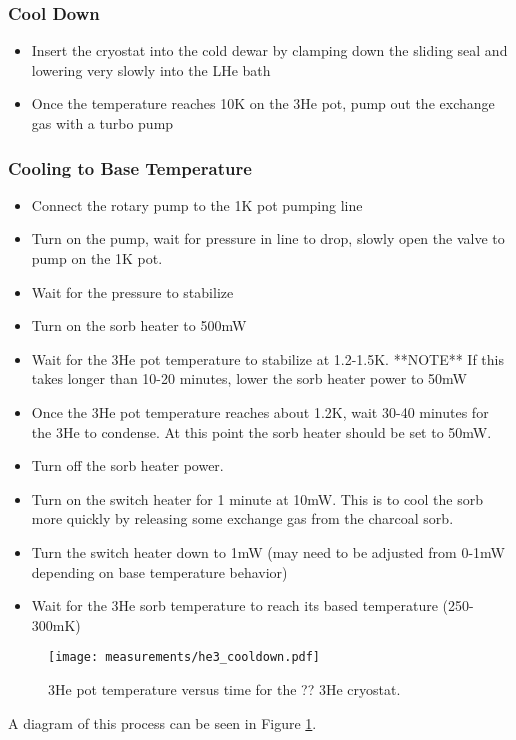\subsubsection*{Cool Down}

\begin{itemize}
\item Insert the cryostat into the cold dewar by clamping down the sliding seal and lowering very slowly into the LHe bath
\item Once the temperature reaches 10K on the 3He pot, pump out the exchange gas with a turbo pump
\end{itemize}

\subsubsection*{Cooling to Base Temperature}

\begin{itemize}
\item Connect the rotary pump to the 1K pot pumping line
\item Turn on the pump, wait for pressure in line to drop, slowly open the valve to pump on the 1K pot.
\item Wait for the pressure to stabilize
\item Turn on the sorb heater to 500mW
\item Wait for the 3He pot temperature to stabilize at 1.2-1.5K. 
**NOTE** If this takes longer than 10-20 minutes, lower the sorb heater power to 50mW
\item Once the 3He pot temperature reaches about 1.2K, wait 30-40 minutes for the 3He to condense. At this point the sorb heater should be set to 50mW.
\item Turn off the sorb heater power.
\item Turn on the switch heater for 1 minute at 10mW. This is to cool the sorb more quickly by releasing some exchange gas from the charcoal sorb.
\item Turn the switch heater down to 1mW (may need to be adjusted from 0-1mW depending on base temperature behavior)
\item Wait for the 3He sorb temperature to reach its based temperature (250-300mK)
\end{itemize}

\begin{figure}
    \centering
    \texttt{[image: measurements/he3\_cooldown.pdf]}
    \caption{3He pot temperature versus time for the ?? 3He cryostat.}
    \label{fig:he3_cooldown}
\end{figure}

A diagram of this process can be seen in Figure \ref{fig:he3_cooldown}.

